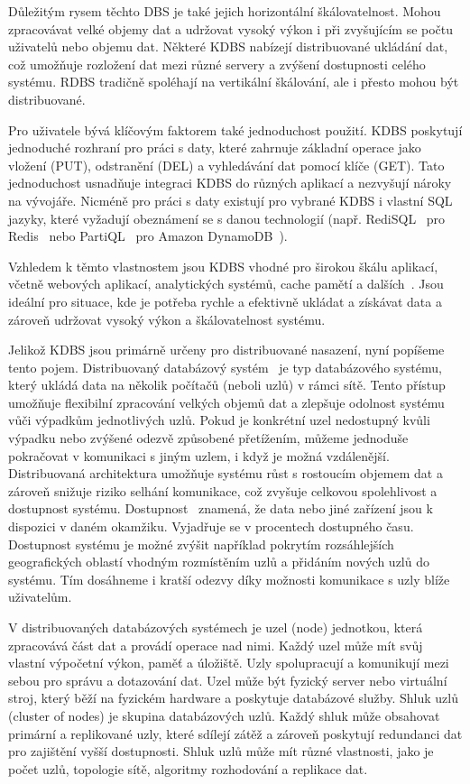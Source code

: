 \documentclass[czech,master,dept460,male,csharp,cpdeclaration]{diploma}
\begin{document}
	Důležitým rysem těchto DBS je také jejich horizontální škálovatelnost. Mohou zpracovávat velké objemy dat a udržovat vysoký výkon i při zvyšujícím se počtu uživatelů nebo objemu dat. Některé KDBS nabízejí distribuované ukládání dat, což umožňuje rozložení dat mezi různé servery a zvýšení dostupnosti celého systému. RDBS tradičně spoléhají na vertikální škálování, ale i přesto mohou být distribuované.
	
	Pro uživatele bývá klíčovým faktorem také jednoduchost použití. KDBS poskytují jednoduché rozhraní pro práci s daty, které zahrnuje základní operace jako vložení (PUT), odstranění (DEL) a vyhledávání dat pomocí klíče (GET). Tato jednoduchost usnadňuje integraci KDBS do různých aplikací a nezvyšují nároky na vývojáře. Nicméně pro práci s daty existují pro vybrané KDBS i vlastní SQL jazyky, které vyžadují obeznámení se s danou technologií (např. RediSQL~\cite{redisql} pro Redis~\cite{redis} nebo PartiQL~\cite{partiql} pro Amazon DynamoDB~\cite{dynamodb}).
	
	Vzhledem k těmto vlastnostem jsou KDBS vhodné pro širokou škálu aplikací, včetně webových aplikací, analytických systémů, cache pamětí a dalších~\cite{kdbs-memory, common-use-kdbs}. Jsou ideální pro situace, kde je potřeba rychle a efektivně ukládat a získávat data a zároveň udržovat vysoký výkon a škálovatelnost systému.
	
	Jelikož KDBS jsou primárně určeny pro distribuované nasazení, nyní popíšeme tento pojem. Distribuovaný databázový systém~\cite{ddbs} je typ databázového systému, který ukládá data na několik počítačů (neboli uzlů) v rámci sítě. Tento přístup umožňuje flexibilní zpracování velkých objemů dat a zlepšuje odolnost systému vůči výpadkům jednotlivých uzlů. Pokud je konkrétní uzel nedostupný kvůli výpadku nebo zvýšené odezvě způsobené přetížením, můžeme jednoduše pokračovat v komunikaci s jiným uzlem, i když je možná vzdálenější. Distribuovaná architektura umožňuje systému růst s rostoucím objemem dat a zároveň snižuje riziko selhání komunikace, což zvyšuje celkovou spolehlivost a dostupnost systému. Dostupnost~\cite{availability} znamená, že data nebo jiné zařízení jsou k dispozici v daném okamžiku. Vyjadřuje se v procentech dostupného času. Dostupnost systému je možné zvýšit například pokrytím rozsáhlejších geografických oblastí vhodným rozmístěním uzlů a přidáním nových uzlů do systému. Tím dosáhneme i kratší odezvy díky možnosti komunikace s uzly blíže uživatelům.
	
	V distribuovaných databázových systémech je uzel (node) jednotkou, která zpracovává část dat a provádí operace nad nimi. Každý uzel může mít svůj vlastní výpočetní výkon, paměť a úložiště. Uzly spolupracují a komunikují mezi sebou pro správu a dotazování dat. Uzel může být fyzický server nebo virtuální stroj, který běží na fyzickém hardware a poskytuje databázové služby. Shluk uzlů (cluster of nodes) je skupina databázových uzlů. Každý shluk může obsahovat primární a replikované uzly, které sdílejí zátěž a zároveň poskytují redundanci dat pro zajištění vyšší dostupnosti. Shluk uzlů může mít různé vlastnosti, jako je počet uzlů, topologie sítě, algoritmy rozhodování a replikace dat.
	
\end{document}
